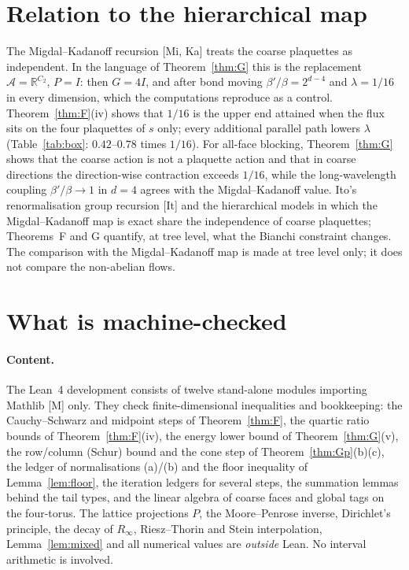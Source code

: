 \documentclass[11pt,a4paper]{article}
\theoremstyle{definition}
\theoremstyle{remark}
\newcommand{\R}{\mathbb{R}}
\newcommand{\cA}{\mathcal{A}}
\begin{document}
\section{Relation to the hierarchical map}\label{sec:mk}

The Migdal--Kadanoff recursion [Mi, Ka] treats the coarse plaquettes as independent. In the language of Theorem~\ref{thm:G} this is the replacement $\cA=\R^{C_2}$, $P=I$: then $G=4I$, and after bond moving $\beta'/\beta=2^{d-4}$ and $\lambda=1/16$ in every dimension, which the computations reproduce as a control. Theorem~\ref{thm:F}(iv) shows that $1/16$ is the upper end attained when the flux sits on the four plaquettes of $s$ only; every additional parallel path lowers $\lambda$ (Table~\ref{tab:box}: $0.42$--$0.78$ times $1/16$). For all-face blocking, Theorem~\ref{thm:G} shows that the coarse action is not a plaquette action and that in coarse directions the direction-wise contraction exceeds $1/16$, while the long-wavelength coupling $\beta'/\beta\to1$ in $d=4$ agrees with the Migdal--Kadanoff value. Ito's renormalisation group recursion [It] and the hierarchical models in which the Migdal--Kadanoff map is exact share the independence of coarse plaquettes; Theorems~F and G quantify, at tree level, what the Bianchi constraint changes. The comparison with the Migdal--Kadanoff map is made at tree level only; it does not compare the non-abelian flows.

\section{What is machine-checked}\label{sec:lean}

\paragraph{Content.}
The Lean~4 development consists of twelve stand-alone modules importing Mathlib [M] only. They check finite-dimensional inequalities and bookkeeping: the Cauchy--Schwarz and midpoint steps of Theorem~\ref{thm:F}, the quartic ratio bounds of Theorem~\ref{thm:F}(iv), the energy lower bound of Theorem~\ref{thm:G}(v), the row/column (Schur) bound and the cone step of Theorem~\ref{thm:Gp}(b)(c), the ledger of normalisations (a)/(b) and the floor inequality of Lemma~\ref{lem:floor}, the iteration ledgers for several steps, the summation lemmas behind the tail types, and the linear algebra of coarse faces and global tags on the four-torus.
The lattice projections $P$, the Moore--Penrose inverse, Dirichlet's principle, the decay of $R_\infty$, Riesz--Thorin and Stein interpolation, Lemma~\ref{lem:mixed} and all numerical values are \emph{outside} Lean. No interval arithmetic is involved.
\end{document}
